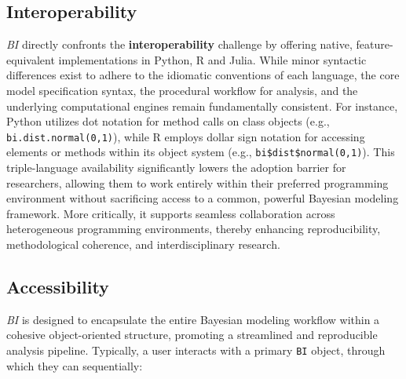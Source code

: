 \documentclass[num-refs]{wiley-article}
\begin{document}
\subsection{Interoperability}\label{Interoperability}
\textit{BI} directly confronts the \textbf{interoperability} challenge by offering native, feature-equivalent implementations in Python, R and Julia. While minor syntactic differences exist to adhere to the idiomatic conventions of each language, the core model specification syntax, the procedural workflow for analysis, and the underlying computational engines remain fundamentally consistent. For instance, Python utilizes dot notation for method calls on class objects (e.g., \texttt{bi.dist.normal(0,1)}), while R employs dollar sign notation for accessing elements or methods within its object system (e.g., \texttt{bi\$dist\$normal(0,1)}). This triple-language availability significantly lowers the adoption barrier for researchers, allowing them to work entirely within their preferred programming environment without sacrificing access to a common, powerful Bayesian modeling framework. More critically, it supports seamless collaboration across heterogeneous programming environments, thereby enhancing reproducibility, methodological coherence, and interdisciplinary research.

\subsection{Accessibility}\label{Accessibility}
\textit{BI} is designed to encapsulate the entire Bayesian modeling workflow within a cohesive object-oriented structure, promoting a streamlined and reproducible analysis pipeline. Typically, a user interacts with a primary \texttt{BI} object, through which they can sequentially:
\end{document}

